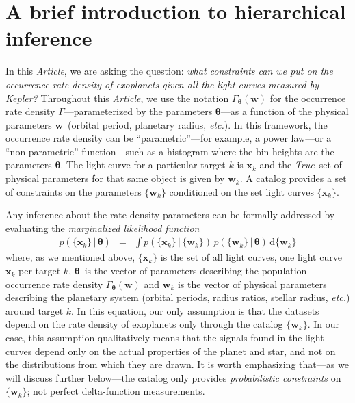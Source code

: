\documentclass[12pt,preprint]{aastex}
\newcommand{\project}[1]{\emph{#1}}
\newcommand{\kepler}{\project{Kepler}}
\newcommand{\paper}{\textsl{Article}}
\newcommand{\foreign}[1]{\emph{#1}}
\newcommand{\etc}{\foreign{etc.}}
\newcommand{\True}{\foreign{True}}
\newcommand{\eqlabel}[1]{\label{eq:#1}}
\newcommand{\dd}{\ensuremath{\,\mathrm{d}}}
\newcommand{\bvec}[1]{\ensuremath{\boldsymbol{#1}}}
\newcommand{\rate}{\ensuremath{\Gamma}}
\newcommand{\ratepar}{{\ensuremath{\theta}}}
\newcommand{\ratepars}{{\ensuremath{\bvec{\ratepar}}}}
\newcommand{\data}{{\ensuremath{\bvec{x}}}}
\newcommand{\entry}{{\ensuremath{\bvec{w}}}}
\begin{document}
\section{A brief introduction to hierarchical inference}

In this \paper, we are asking the question: \emph{what constraints can we put
on the occurrence rate density of exoplanets given all the light curves
measured by \kepler?}
Throughout this \paper, we use the notation $\rate_\ratepars(\entry)$ for the
occurrence rate density \rate---parameterized by the parameters \ratepars---as
a function of the physical parameters \entry\ (orbital period, planetary
radius, \etc).
In this framework, the occurrence rate density can be ``parametric''---for
example, a power law---or a ``non-parametric'' function---such as a histogram
where the bin heights are the parameters \ratepars.
The light curve for a particular target $k$ is $\data_k$ and the \True\ set of
physical parameters for that same object is given by $\entry_k$.
A catalog provides a set of constraints on the parameters $\{\entry_k\}$
conditioned on the set light curves $\{\data_k\}$.

Any inference about the rate density parameters can be formally addressed by
evaluating the \emph{marginalized likelihood function}
\begin{eqnarray}\eqlabel{crazylike}
p(\{\data_k\}\,|\,\ratepars) &=&
    \int p(\{\data_k\}\,|\,\{\entry_k\})
    \,p(\{\entry_k\}\,|\,\ratepars)
    \dd\{\entry_k\}
\end{eqnarray}
where, as we mentioned above, $\{\data_k\}$ is the set of all light curves,
one light curve $\data_k$ per target $k$, \ratepars\ is the vector of
parameters describing the population occurrence rate density
$\rate_\ratepars(\entry)$ and $\entry_k$ is the vector of physical parameters
describing the planetary system (orbital periods, radius ratios, stellar
radius, \etc) around target $k$.
In this equation, our only assumption is that the datasets depend on the
rate density of exoplanets only through the catalog $\{\entry_k\}$.
In our case, this assumption qualitatively means that the signals found in the
light curves depend only on the actual properties of the planet and star, and
not on the distributions from which they are drawn.
It is worth emphasizing that---as we will discuss further below---the catalog
only provides \emph{probabilistic constraints} on $\{\entry_k\}$; not perfect
delta-function measurements.
\end{document}
